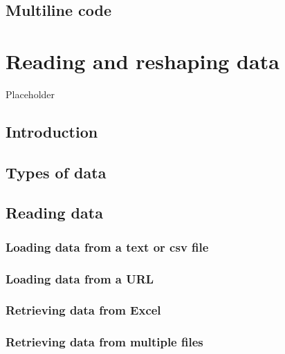 \documentclass[
]{book}
\begin{document}
\hypertarget{multiline-code}{%
\section{Multiline code}\label{multiline-code}}

\hypertarget{read-and-reshape}{%
\chapter{Reading and reshaping data}\label{read-and-reshape}}

Placeholder

\hypertarget{introduction}{%
\section{Introduction}\label{introduction}}

\hypertarget{types-of-data}{%
\section{Types of data}\label{types-of-data}}

\hypertarget{reading-data}{%
\section{Reading data}\label{reading-data}}

\hypertarget{loading-data-from-a-text-or-csv-file}{%
\subsection{Loading data from a text or csv file}\label{loading-data-from-a-text-or-csv-file}}

\hypertarget{loading-data-from-a-url}{%
\subsection{Loading data from a URL}\label{loading-data-from-a-url}}

\hypertarget{retrieving-data-from-excel}{%
\subsection{Retrieving data from Excel}\label{retrieving-data-from-excel}}

\hypertarget{retrieving-data-from-multiple-files}{%
\subsection{Retrieving data from multiple files}\label{retrieving-data-from-multiple-files}}
\end{document}
